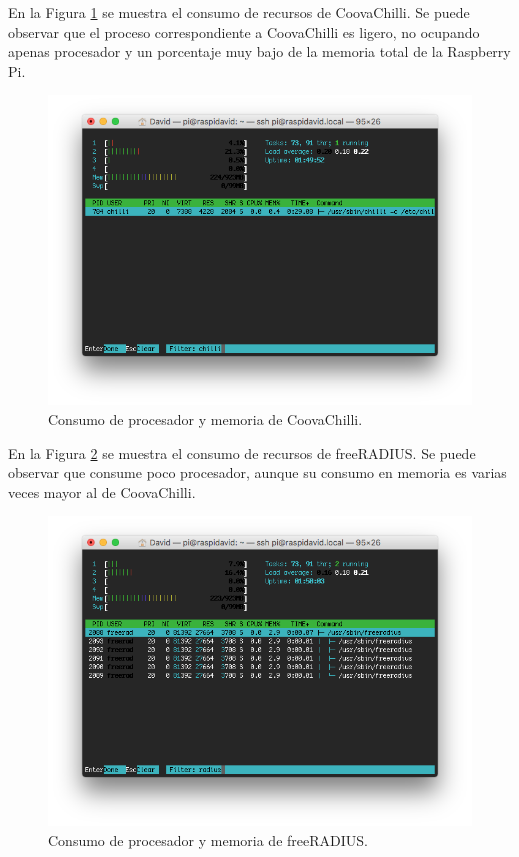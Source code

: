 En la Figura \ref{htopChilli} se muestra el consumo de recursos de CoovaChilli. Se puede observar que el proceso correspondiente a CoovaChilli es ligero, no ocupando apenas procesador y un porcentaje muy bajo de la memoria total de la Raspberry Pi.

\begin{figure}[!t]
\begin{center}
\includegraphics[width=0.75\linewidth]{./6_EvalEmpirica/Img/htopChilli.png}
\end{center}
\caption{Consumo de procesador y memoria de CoovaChilli.}
\label{htopChilli}
\end{figure}

En la Figura \ref{htopRADIUS} se muestra el consumo de recursos de freeRADIUS. Se puede observar que consume poco procesador, aunque su consumo en memoria es varias veces mayor al de CoovaChilli.

\begin{figure}[!t]
\begin{center}
\includegraphics[width=0.75\linewidth]{./6_EvalEmpirica/Img/htopRADIUS.png}
\end{center}
\caption{Consumo de procesador y memoria de freeRADIUS.}
\label{htopRADIUS}
\end{figure}

